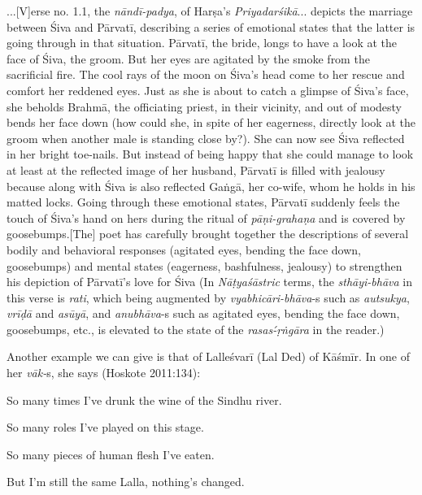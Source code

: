 \begin{myquote}
...[V]erse no. 1.1, the \textsl{nāndī-padya}, of Harṣa’s \textsl{Priyadarśikā}... depicts the marriage between Śiva and Pārvatī, describing a series of emotional states that the latter is going through in that situation. Pārvatī, the bride, longs to have a look at the face of Śiva, the groom. But her eyes are agitated by the smoke from the sacrificial fire. The cool rays of the moon on Śiva’s head come to her rescue and comfort her reddened eyes. Just as she is about to catch a glimpse of Śiva’s face, she beholds Brahmā, the officiating priest, in their vicinity, and out of modesty bends her face down (how could she, in spite of her eagerness, directly look at the groom when another male is standing close by?). She can now see Śiva reflected in her bright toe-nails. But instead of being happy that she could manage to look at least at the reflected image of her husband, Pārvatī is filled with jealousy because along with Śiva is also reflected Gaṅgā, her co-wife, whom he holds in his matted locks. Going through these emotional states, Pārvatī suddenly feels the touch of Śiva’s hand on hers during the ritual of \textsl{pāṇi-grahaṇa} and is covered by goosebumps.[The] poet has carefully brought together the descriptions of several bodily and behavioral responses (agitated eyes, bending the face down, goosebumps) and mental states (eagerness, bashfulness, jealousy) to strengthen his depiction of Pārvatī’s love for Śiva (In \textsl{Nāṭyaśāstric} terms, the \textsl{sthāyi-bhāva} in this verse is \textsl{rati}, which being augmented by \textsl{vyabhicāri-bhāva}-s such as \textsl{autsukya}, \textsl{vrīḍā} and \textsl{asūyā}, and \textsl{anubhāva}-s such as agitated eyes, bending the face down, goosebumps, etc., is elevated to the state of the \textsl{rasas-́ṛṅgāra} in the reader.)
\end{myquote}

Another example we can give is that of Lalleśvarī (Lal Ded) of Kāśmīr. In one of her \textsl{vāk-}s, she says (Hoskote 2011:134):

\begin{myquote}
So many times I’ve drunk the wine of the Sindhu river.

So many roles I’ve played on this stage.

So many pieces of human flesh I’ve eaten.

But I’m still the same Lalla, nothing’s changed.
\end{myquote}


